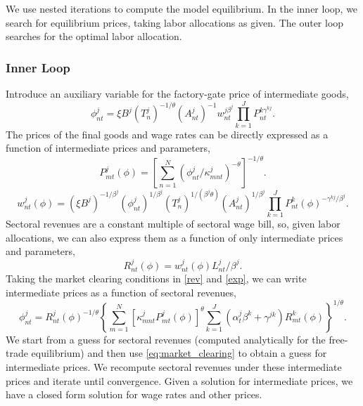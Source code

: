 \documentclass[12pt]{article}
\begin{document}
We use nested iterations to compute the model equilibrium. In the inner loop, we search for equilibrium prices, taking labor allocations as given. The outer loop searches for the optimal labor allocation.

\subsubsection*{Inner Loop}
Introduce an auxiliary variable for the factory-gate price of intermediate goods,
\begin{equation}\label{eq:varrho}
	\phi_{nt}^j = \xi B^j (T_{n}^j)^{-1/\theta} (A_{nt}^j)^{-1} w_{nt}^{j\beta^j} \prod_{k=1}^J P_{nt}^{k\gamma^{kj}}.
\end{equation}
The prices of the final goods and wage rates can be directly expressed as a function of intermediate prices and parameters,
\begin{equation}\label{eq:price}
	P_{mt}^j(\phi) = \left[
		\sum_{n=1}^N (\phi_{nt}^j/\kappa_{mnt}^j)^{-\theta}
		\right]^{-1/\theta}.
\end{equation}
\begin{equation}\label{eq:wage}
	w_{nt}^j(\phi) = (\xi B^j)^{-1/\beta^j}
	(\phi_{nt}^j)^{1/\beta^j}  
	(T_{n}^j)^{1/(\beta^j\theta)}(A_{nt}^j)^{1/\beta^j} 
	\prod_{k=1}^J P_{nt}^k(\phi)^{-\gamma^{kj}/\beta^j}.
\end{equation}
Sectoral revenues are a constant multiple of sectoral wage bill, so, given labor allocations, we can also express them as a function of only intermediate prices and parameters,
\begin{equation}\label{eq:revenue}
	R_{nt}^j(\phi) = w_{nt}^j(\phi)L_{nt}^j/\beta^j.
\end{equation}
Taking the market clearing conditions in \eqref{rev} and \eqref{exp}, we can write intermediate prices as a function of sectoral revenues,
\begin{equation}\label{eq:market_clearing}
	\phi_{nt}^j = R_{nt}^j(\phi)^{-1/\theta}
	\left\{
	\sum_{m=1}^N
		[\kappa_{mnt}^j P_{mt}^j(\phi)]^{\theta}
		\sum_{k=1}^J
			\left( \alpha_{t}^j
				\beta^k 
			+ \gamma^{jk}\right)R_{mt}^k(\phi)
	\right\}^{1/\theta}.
\end{equation}
We start from a guess for sectoral revenues (computed analytically for the free-trade equilibrium) and then use \eqref{eq:market_clearing} to obtain a guess for intermediate prices. We recompute sectoral revenues under these intermediate prices and iterate until convergence. Given a solution for intermediate prices, we have a closed form solution for wage rates and other prices.
\end{document}
